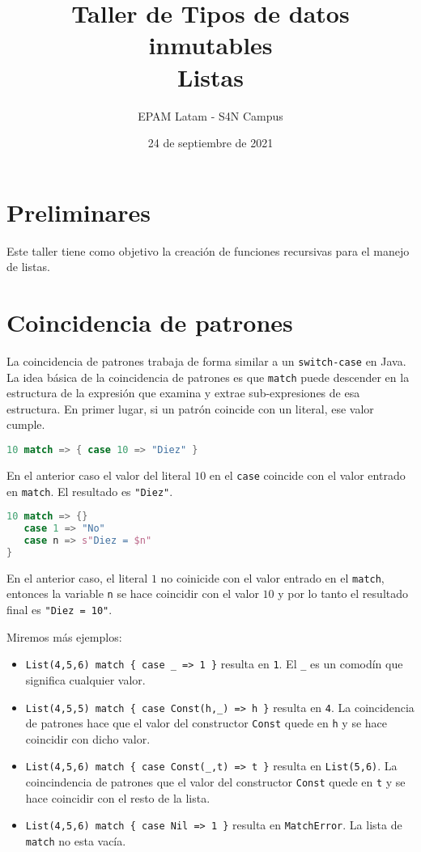 \documentclass[12pt]{article}
\title{Taller de Tipos de datos inmutables\\Listas}
\date{24 de septiembre de 2021}
\author{EPAM Latam - S4N Campus}
\begin{document}
\maketitle

\section{Preliminares}
\label{sec:preliminares}

Este taller tiene como objetivo la creación de funciones recursivas para el manejo de listas.

\section{Coincidencia de patrones}
\label{sec:listas}

La coincidencia de patrones trabaja de forma similar a un
\texttt{switch-case} en Java. La idea básica de la coincidencia de
patrones es que \texttt{match} puede descender en la estructura de la
expresión que examina y extrae sub-expresiones de esa estructura. En primer lugar, si un patrón coincide con un literal, ese valor cumple.

\begin{lstlisting}[language=Scala]
10 match => { case 10 => "Diez" }
\end{lstlisting}

En el anterior caso el valor del literal $10$ en el \texttt{case} coincide con el valor entrado en \texttt{match}. El resultado es \texttt{"Diez"}.

\begin{lstlisting}[language=Scala]
10 match => {}
   case 1 => "No"
   case n => s"Diez = $n"
}
\end{lstlisting}

En el anterior caso, el literal
$1$ no coinicide con el valor entrado en el \texttt{match}, entonces
la variable \texttt{n} se hace coincidir con el valor
$10$ y por lo tanto el resultado final es \texttt{"Diez = 10"}.

Miremos más ejemplos:

\begin{itemize}
\item \texttt{List(4,5,6) match \{ case \_ => 1 \}} resulta en
  \texttt{1}. El \texttt{\_} es un comodín que significa cualquier
  valor.
\item \texttt{List(4,5,5) match \{ case Const(h,\_) => h \}} resulta en \texttt{4}. La coincidencia de patrones hace que el valor del constructor \texttt{Const}
  quede en \texttt{h} y se hace coincidir con dicho valor.
\item \texttt{List(4,5,6) match \{ case Const(\_,t) => t \}} resulta en \texttt{List(5,6)}. La coincindencia de patrones que el valor del constructor \texttt{Const}
  quede en \texttt{t} y se hace coincidir con el resto de la lista.
\item \texttt{List(4,5,6) match \{ case Nil => 1 \}} resulta en \texttt{MatchError}. La lista de \texttt{match} no esta vacía.
\end{itemize}
\end{document}
